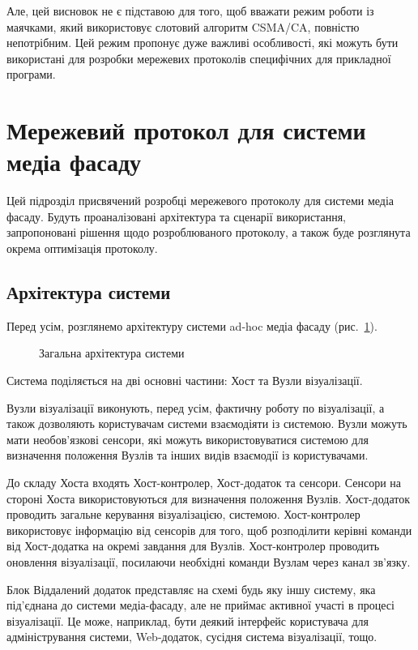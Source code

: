 \documentclass[a4paper,ukrainian,utf8,nocolumnsxix,floatsection,equationsection]{eskdtext}
\let\stdsection\section
\renewcommand\section{\clearpage\stdsection}
\newcommand{\figref}[1]{рис.~\ref{#1}}
\newcommand{\csma}[0]{CSMA/CA\xspace}
\begin{document}
Але, цей висновок не є підставою для того, щоб вважати режим роботи із маячками, який використовує слотовий алгоритм \csma, повністю непотрібним. Цей режим пропонує дуже важливі особливості, які можуть бути використані для розробки мережевих протоколів специфічних для прикладної програми.

\section{Мережевий протокол для системи медіа фасаду}
\label{sec:network:protocol:amf}


Цей підрозділ присвячений розробці мережевого протоколу для системи медіа фасаду. Будуть проаналізовані архітектура та сценарії використання, запропоновані рішення щодо розроблюваного протоколу, а також буде розглянута окрема оптимізація протоколу.

\subsection{Архітектура системи}
\label{sub:system:arch}

Перед усім, розглянемо архітектуру системи ad-hoc медіа фасаду (\figref{fig:sys_arch}). 

\begin{figure}[bth]
\centering
{}
\caption{\label{fig:sys_arch}Загальна архітектура системи}
\end{figure}

Система поділяється на дві основні частини: Хост та Вузли візуалізації.

Вузли візуалізації виконують, перед усім, фактичну роботу по візуалізації, а також дозволяють користувачам системи взаємодіяти із системою. Вузли можуть мати необов’язкові сенсори, які можуть використовуватися системою для визначення положення Вузлів та інших видів взаємодії із користувачами.

До складу Хоста входять Хост-контролер, Хост-додаток та сенсори. Сенсори на стороні Хоста використовуються для визначення положення Вузлів. Хост-додаток проводить загальне керування візуалізацією, системою. Хост-контролер використовує інформацію від сенсорів для того, щоб розподілити керівні команди від Хост-додатка на окремі завдання для Вузлів. Хост-контролер проводить оновлення візуалізації, посилаючи необхідні команди Вузлам через канал зв’язку.

Блок Віддалений додаток представляє на схемі будь яку іншу систему, яка під’єднана до системи медіа-фасаду, але не приймає активної участі в процесі візуалізації. Це може, наприклад, бути деякий інтерфейс користувача для адміністрування системи, Web-додаток, сусідня система візуалізації, тощо.
\end{document}
